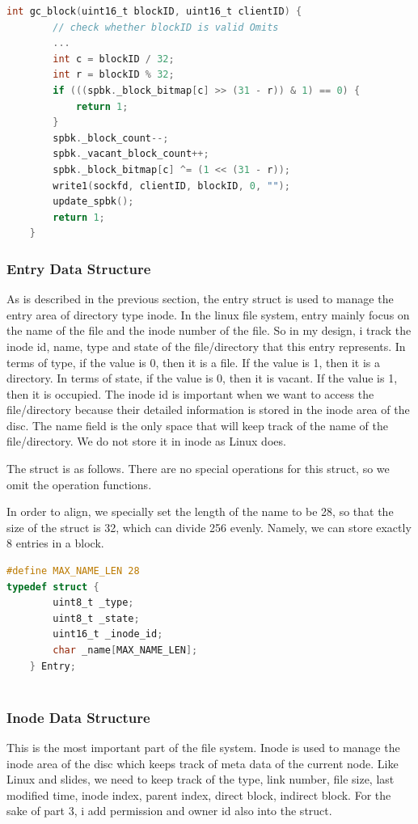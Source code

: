 \begin{lstlisting}[language=C]
    int gc_block(uint16_t blockID, uint16_t clientID) {
        // check whether blockID is valid Omits
        ... 
        int c = blockID / 32;
        int r = blockID % 32;
        if (((spbk._block_bitmap[c] >> (31 - r)) & 1) == 0) {
            return 1;
        }
        spbk._block_count--;
        spbk._vacant_block_count++;
        spbk._block_bitmap[c] ^= (1 << (31 - r));
        write1(sockfd, clientID, blockID, 0, "");
        update_spbk();
        return 1;
    }       
\end{lstlisting}

\subsubsection{Entry Data Structure}
As is described in the previous section, the entry struct is used to manage the entry area of directory type inode. 
In the linux file system, entry mainly focus on the name of the file and the inode number of the file. So in my design, 
i track the inode id, name, type and state of the file/directory that this entry represents.
In terms of type, if the value is 0, then it is a file. If the value is 1, then it is a directory. In terms of state, if the value is 0, then it is vacant. If the value is 1, then it is occupied.
The inode id is important when we want to access the file/directory because their detailed information is stored in the inode area of the disc.
The name field is the only space that will keep track of the name of the file/directory. We do not store it in inode as Linux does.

The struct is as follows. There are no special operations for this struct, so we omit the operation functions.

In order to align, we specially set the length of the name to be 28, so that the size of the struct is 32, which can divide 256 evenly. Namely, we can store exactly
8 entries in a block.

\begin{lstlisting}[language=C]
#define MAX_NAME_LEN 28
typedef struct {
        uint8_t _type;
        uint8_t _state;
        uint16_t _inode_id;
        char _name[MAX_NAME_LEN];
    } Entry;
        
\end{lstlisting}

\subsubsection{Inode Data Structure}
This is the most important part of the file system. Inode is used to manage the inode area of the disc which keeps track of meta data of the current node.
Like Linux and slides, we need to keep track of the type, link number, file size, last modified time, inode index, parent index, direct block, indirect block. For the 
sake of part 3, i add permission and owner id also into the struct. 

